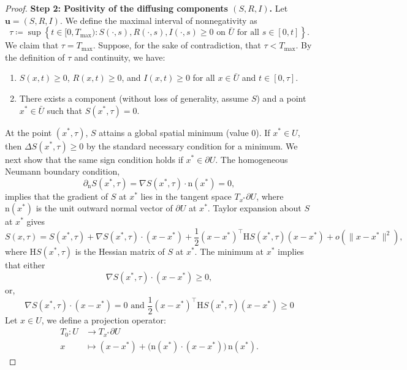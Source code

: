 \documentclass[10pt,a4paper]{amsart}
\begin{document}
\begin{proof}
\smallskip
\noindent\textbf{Step 2: Positivity of the diffusing components $(S,R,I)$.}
Let $\mathbf{u}=(S,R,I)$. We define the maximal interval of nonnegativity as
\begin{equation*}
    \tau\coloneqq \sup\left\{t\in [0,T_{\max}): S(\cdot,s), R(\cdot,s), I(\cdot,s)\ge 0 \text{ on } \bar U \text{ for all } s\in [0,t] \right\}.
\end{equation*}
We claim that $\tau=T_{\max}$. 
Suppose, for the sake of contradiction, that $\tau<T_{\max}$.
By the definition of $\tau$ and continuity, we have:
\begin{enumerate}[label=(\roman*)]
    \item $S(x,t) \ge 0$, $R(x,t)\ge 0$, and $I(x,t)\ge 0$ for all $x\in \bar U$ and $t\in [0,\tau]$.
    \item There exists a component (without loss of generality, assume $S$) and a point $x^*\in \bar U$ such that $S(x^*,\tau)=0$.
\end{enumerate}
At the point $(x^*,\tau)$, $S$ attains a global spatial minimum (value $0$). If $x^*\in U$, then $\Delta S(x^*,\tau)\ge 0$ by the standard necessary condition for a minimum. We next show that the same sign condition holds if $x^*\in \partial U$. The homogeneous Neumann boundary condition,
\[
\partial_{\mathrm n} S(x^*,\tau) = \nabla S(x^*,\tau)\cdot \mathrm n(x^*) = 0,
\]
implies that the gradient of $S$ at $x^*$ lies in the tangent space $T_{x^*}\partial U$, where $\mathrm n(x^*)$ is the unit outward normal vector of $\partial U$ at $x^*$.
Taylor expansion about $S$ at $x^*$ gives
\begin{equation*}
    S(x,\tau) = S(x^*,\tau) + \nabla S(x^*,\tau)\cdot (x-x^*) + \frac{1}{2} (x-x^*)^\top \mathrm{H}S(x^*,\tau) (x-x^*) + o(\lVert x-x^*\rVert ^2), 
\end{equation*}
where $\mathrm{H}S(x^*,\tau)$ is the Hessian matrix of $S$ at $x^*$.
The minimum at $x^*$ implies that either 
\begin{equation}\label{eq:minimum_condition1}
\nabla S(x^*,\tau)\cdot (x-x^*) \ge 0,
\end{equation}
or, 
\begin{equation}\label{eq:minimum_condition2}
\nabla S(x^*,\tau)\cdot (x-x^*) = 0 \text{ and } \frac{1}{2} (x-x^*)^\top \mathrm{H}S(x^*,\tau) (x-x^*)\ge 0
\end{equation}
Let $x\in U$, we define a projection operator:
\begin{align*}
    T_0: U &\to T_{x^*}\partial U \\[4pt]
       x &\mapsto (x-x^*) + \Big(\mathrm n(x^*)\cdot (x-x^*)\Big)\, \mathrm{n}(x^*).

\end{align*}
\end{proof}
\end{document}
